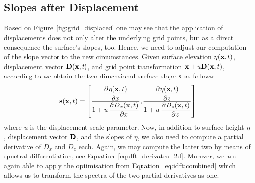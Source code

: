 \subsection{Slopes after Displacement}
%
Based on Figure~\ref{fig:grid_displaced} one may see that the application 
of displacements does not only alter the underlying grid points, but as a 
direct consequence the surface's slopes, too. Hence, we need to adjust our 
computation of the slope vector to the new circumstances. Given surface 
elevation $\eta(\mathbf{x},t)$, displacement vector $\mathbf{D}(\mathbf{x},t)$,
and grid point transformation $\mathbf{x} + u\mathbf{D}(\mathbf{x},t)$,
according to \citet[private communication]{article:whitecaps} we obtain the
two dimensional surface slope $\mathbf{s}$ as follows:
\begin{equation}
\mvec{s}(\mvec{x},t) = \left[\frac{\dpd{\eta(\mvec{x},t)}{x}}{1 + u 
\dpd{D_x(\mvec{x},t)}{x}}, \frac{\dpd{\eta(\mvec{x},t)}{z}}{1 + u 
\dpd{D_z(\mvec{x},t)}{z}}\right]
\end{equation}
where $u$ is the displacement scale parameter. Now, in addition
to surface height $\eta$, displacement vector $\mathbf{D}$, and the slopes of $\eta$,
we also need to compute a partial derivative of $D_x$ and $D_z$ each.
Again, we may compute the latter two by means of spectral
differentiation, see Equation~\ref{eq:dft_derivates_2d}. Morever, we are again
able to apply the optimisation from Equation~\ref{eq:idft:combined} which allows
us to transform the spectra of the two partial derivatives as one.
%
